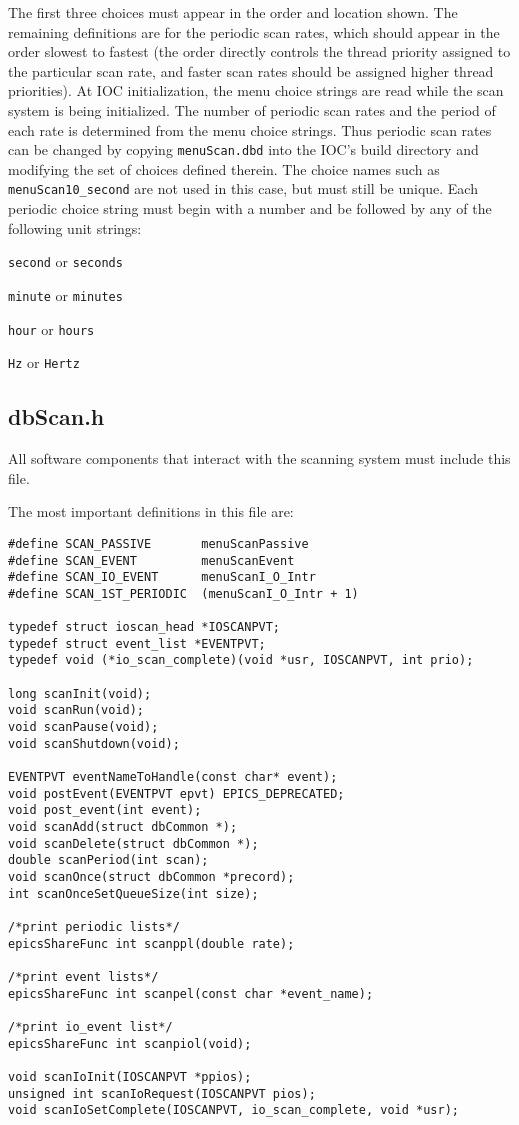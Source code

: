 The first three choices must appear in the order and location shown.
The remaining definitions are for the periodic scan rates, which should appear in the order slowest to fastest (the order directly controls the thread priority assigned to the particular scan rate, and faster scan rates should be assigned higher thread priorities).
At IOC initialization, the menu choice strings are read while the scan system is being initialized.
The number of periodic scan rates and the period of each rate is determined from the menu choice strings.
Thus periodic scan rates can be changed by copying \verb|menuScan.dbd| into the IOC's build directory and modifying the set of choices defined therein.
The choice names such as \verb|menuScan10_second| are not used in this case, but must still be unique.
Each periodic choice string must begin with a number and be followed by any of the following unit strings:

\begin{description}
\item \verb|second| or \verb|seconds|
\item \verb|minute| or \verb|minutes|
\item \verb|hour| or \verb|hours|
\item \verb|Hz| or \verb|Hertz|
\end{description}

\subsection{dbScan.h}

All software components that interact with the scanning system must include this file.

The most important definitions in this file are:

\begin{verbatim}
#define SCAN_PASSIVE       menuScanPassive
#define SCAN_EVENT         menuScanEvent
#define SCAN_IO_EVENT      menuScanI_O_Intr
#define SCAN_1ST_PERIODIC  (menuScanI_O_Intr + 1)

typedef struct ioscan_head *IOSCANPVT;
typedef struct event_list *EVENTPVT;
typedef void (*io_scan_complete)(void *usr, IOSCANPVT, int prio);

long scanInit(void);
void scanRun(void);
void scanPause(void);
void scanShutdown(void);

EVENTPVT eventNameToHandle(const char* event);
void postEvent(EVENTPVT epvt) EPICS_DEPRECATED;
void post_event(int event);
void scanAdd(struct dbCommon *);
void scanDelete(struct dbCommon *);
double scanPeriod(int scan);
void scanOnce(struct dbCommon *precord);
int scanOnceSetQueueSize(int size);

/*print periodic lists*/
epicsShareFunc int scanppl(double rate);

/*print event lists*/
epicsShareFunc int scanpel(const char *event_name);

/*print io_event list*/
epicsShareFunc int scanpiol(void);

void scanIoInit(IOSCANPVT *ppios);
unsigned int scanIoRequest(IOSCANPVT pios);
void scanIoSetComplete(IOSCANPVT, io_scan_complete, void *usr);
\end{verbatim}

